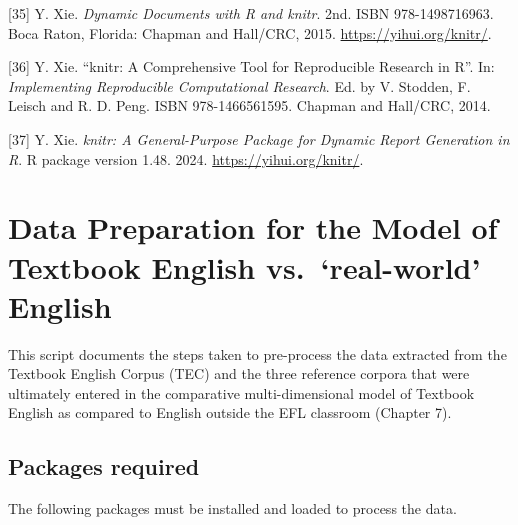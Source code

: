 \documentclass[
  letterpaper,
  DIV=11,
  numbers=noendperiod]{scrreprt}
\begin{document}
{[}35{]} Y. Xie. \emph{Dynamic Documents with R and knitr}. 2nd. ISBN
978-1498716963. Boca Raton, Florida: Chapman and Hall/CRC, 2015.
\url{https://yihui.org/knitr/}.

{[}36{]} Y. Xie. ``knitr: A Comprehensive Tool for Reproducible Research
in R''. In: \emph{Implementing Reproducible Computational Research}. Ed.
by V. Stodden, F. Leisch and R. D. Peng. ISBN 978-1466561595. Chapman
and Hall/CRC, 2014.

{[}37{]} Y. Xie. \emph{knitr: A General-Purpose Package for Dynamic
Report Generation in R}. R package version 1.48. 2024.
\url{https://yihui.org/knitr/}.

\chapter{Data Preparation for the Model of Textbook English
vs.~`real-world'
English}\label{data-preparation-for-the-model-of-textbook-english-vs.-real-world-english}

This script documents the steps taken to pre-process the data extracted
from the Textbook English Corpus (TEC) and the three reference corpora
that were ultimately entered in the comparative multi-dimensional model
of Textbook English as compared to English outside the EFL classroom
(Chapter 7).

\section{Packages required}\label{packages-required-2}

The following packages must be installed and loaded to process the data.
\end{document}
